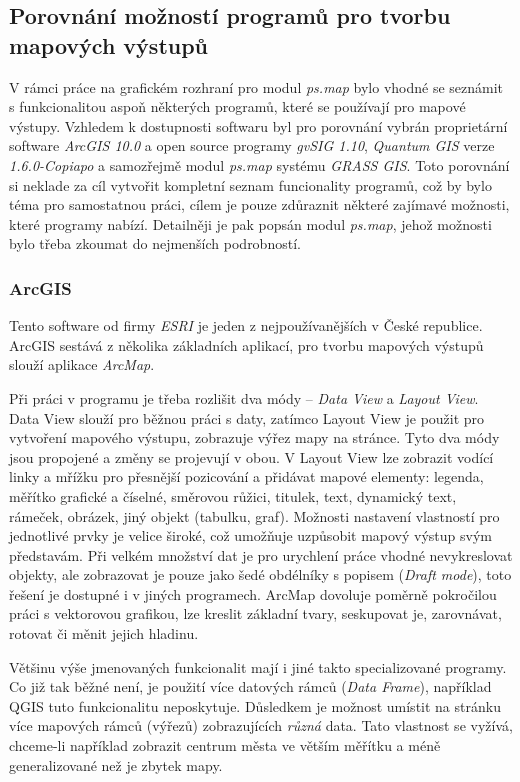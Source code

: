 \documentclass[a4paper,12pt,draft]{article}
\newcommand{\modul}[1]{\emph{#1}}
\begin{document}
\subsection{Porovnání možností programů pro tvorbu mapových výstupů}
V rámci práce na grafickém rozhraní pro modul \modul{ps.map} bylo vhodné se seznámit s funkcionalitou aspoň některých programů, které se používají pro mapové výstupy. Vzhledem k dostupnosti softwaru byl pro porovnání vybrán proprietární software \emph{ArcGIS 10.0} a
open source programy \emph{gvSIG 1.10}, \emph{Quantum GIS} verze \emph{1.6.0-Copiapo} a samozřejmě modul \modul{ps.map} systému \emph{GRASS GIS}.
Toto porovnání si neklade za cíl vytvořit kompletní seznam funcionality programů, což by bylo téma pro samostatnou práci, cílem je pouze zdůraznit některé zajímavé možnosti, které programy nabízí. Detailněji je pak popsán modul \modul{ps.map}, jehož možnosti bylo třeba zkoumat do nejmenších podrobností.

\subsubsection{ArcGIS}
Tento software od firmy \emph{ESRI} je jeden z nejpoužívanějších v České republice. ArcGIS sestává z několika základních aplikací,  pro tvorbu mapových výstupů slouží aplikace \emph{ArcMap}.

Při práci v programu je třeba rozlišit dva módy -- \emph{Data View} a \emph{Layout View}. Data View slouží pro běžnou práci s daty, zatímco Layout View je použit pro vytvoření mapového výstupu, zobrazuje výřez mapy na stránce. Tyto dva módy jsou propojené a změny se projevují v obou. V Layout View lze zobrazit vodící linky a mřížku pro přesnější pozicování  a  přidávat mapové elementy: legenda, měřítko grafické a číselné, směrovou růžici, titulek, text, dynamický text, rámeček, obrázek, jiný objekt (tabulku, graf).  Možnosti nastavení vlastností pro jednotlivé prvky je velice široké, což umožňuje uzpůsobit mapový výstup svým představám. Při velkém množství dat je pro urychlení práce vhodné nevykreslovat objekty, ale zobrazovat je pouze jako šedé obdélníky s popisem (\emph{Draft mode}), toto řešení je dostupné i v jiných programech. ArcMap dovoluje poměrně pokročilou práci s vektorovou grafikou, lze kreslit základní tvary, seskupovat je, zarovnávat, rotovat či měnit jejich hladinu.

Většinu výše jmenovaných funkcionalit mají i jiné takto specializované programy. Co již tak běžné není, je použití více datových rámců (\emph{Data Frame}), například QGIS tuto funkcionalitu neposkytuje. Důsledkem je možnost umístit na stránku více mapových rámců (výřezů) zobrazujících \emph{různá} data. Tato vlastnost se vyžívá, chceme-li například zobrazit centrum města ve větším měřítku a méně generalizované než je zbytek mapy. 
\end{document}
